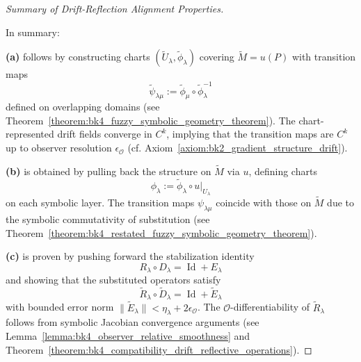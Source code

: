 \begin{proof}[Summary of Drift-Reflection Alignment Properties]
\leavevmode

\label{proof:bk4_drift_reflection_summary}

In summary:

\textbf{(a)} follows by constructing charts \( (\tilde{U}_\lambda, \tilde{\phi}_\lambda) \) covering \( \tilde{M} = u(P) \) with transition maps 
\[
\tilde{\psi}_{\lambda\mu} := \tilde{\phi}_\mu \circ \tilde{\phi}_\lambda^{-1}
\]
defined on overlapping domains (see Theorem~\ref{theorem:bk4_fuzzy_symbolic_geometry_theorem}). The chart-represented drift fields converge in \( C^k \), implying that the transition maps are \( C^k \) up to observer resolution \( \epsilon_\mathcal{O} \) (cf. Axiom~\ref{axiom:bk2_gradient_structure_drift}).

\textbf{(b)} is obtained by pulling back the structure on \( \tilde{M} \) via \( u \), defining charts 
\[
\phi_\lambda := \tilde{\phi}_\lambda \circ u|_{U_\lambda}
\]
on each symbolic layer. The transition maps \( \psi_{\lambda\mu} \) coincide with those on \( \tilde{M} \) due to the symbolic commutativity of substitution (see Theorem~\ref{theorem:bk4_restated_fuzzy_symbolic_geometry_theorem}).

\textbf{(c)} is proven by pushing forward the stabilization identity 
\[
R_\lambda \circ D_\lambda = \operatorname{Id} + E_\lambda
\]
and showing that the substituted operators satisfy
\[
\tilde{R}_\lambda \circ \tilde{D}_\lambda = \operatorname{Id} + \tilde{E}_\lambda
\]
with bounded error norm \( \|\tilde{E}_\lambda\| < \eta_\lambda + 2\epsilon_\mathcal{O} \). The \( \mathcal{O} \)-differentiability of \( \tilde{R}_\lambda \) follows from symbolic Jacobian convergence arguments (see Lemma~\ref{lemma:bk4_observer_relative_smoothness} and Theorem~\ref{theorem:bk4_compatibility_drift_reflective_operations}).

\end{proof}

